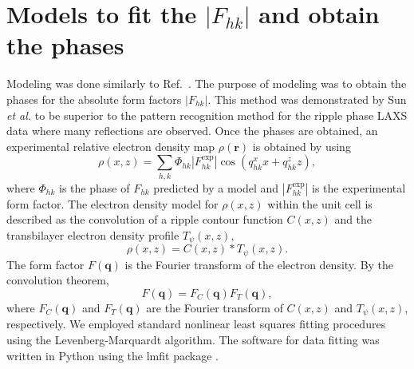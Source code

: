 \newpage
\section{Models to fit the $|F_{hk}|$ and obtain the phases}\label{sec:LAXS_models}
Modeling was done similarly to Ref.~\cite{ref:Sun96}. The purpose of modeling
was to obtain the phases for the absolute form factors $|F_{hk}|$.
This method was demonstrated by Sun \textit{et al.} to be superior to the
pattern recognition method for the ripple phase LAXS data
where many reflections are observed. Once the phases are obtained,
an experimental relative electron density map $\rho(\mathbf{r})$ is obtained
by using
\begin{equation}
  \rho(x,z) = \sum_{h,k} \Phi_{hk} \left|F_{hk}^\text{exp}\right| \cos(q_{hk}^xx+q_{hk}^zz),
  \label{eq:Fourier_reconstruction}
\end{equation}
where $\Phi_{hk}$ is the phase of $F_{hk}$ predicted by a model and 
$\left|F_{hk}^\text{exp}\right|$ is the experimental form factor.
The electron density model for $\rho(x,z)$ within the unit cell is described
as the convolution of a ripple contour function $C(x,z)$ and the transbilayer
electron density profile $T_\psi(x,z)$,
\begin{equation}
  \rho(x,z) = C(x,z) * T_\psi(x,z).
\end{equation}
The form factor $F(\mathbf{q})$ is the Fourier transform of the electron density.
By the convolution theorem, 
\begin{equation}
  F(\mathbf{q}) = F_C(\mathbf{q})F_T(\mathbf{q}),
\end{equation}
where $F_C(\mathbf{q})$ and $F_T(\mathbf{q})$ are the Fourier transform 
of $C(x,z)$ and $T_\psi(x,z)$, respectively.
We employed standard nonlinear least squares fitting procedures using
the Levenberg-Marquardt algorithm.
The software for data fitting was written in Python using 
the lmfit package \cite{ref:lmfit}.

